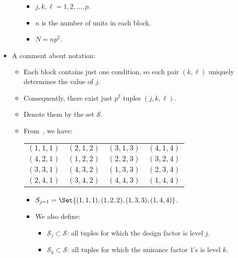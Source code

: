 \begin{itemize}
\begin{itemize}
\begin{itemize}
                        \item $ j,k,\ell=1,2,\ldots,p $.
                        \item $ n $ is the number of units in each block.
                        \item $ N=np^2 $.
                    \end{itemize}
          \end{itemize}
    \item A comment about notation:
          \begin{itemize}
              \item Each block contains just one condition, so each pair $(k, \ell)$ uniquely determines the value of $j$.
              \item Consequently, there exist just $p^2$ tuples $(j, k, \ell)$.
              \item Denote them by the set $ \mathcal{S} $.
              \item From~, we have:
                    \begin{table}[!htbp]
                        \centering
                        \begin{NiceTabular}{|cccc|}
                            \toprule
                            $ (1,1,1) $ & $ (2,1,2) $ & $ (3,1,3) $ & $ (4,1,4) $\\
                            $ (4,2,1) $ & $ (1,2,2) $ & $ (2,2,3) $ & $ (3,2,4) $\\
                            $ (3,3,1) $ & $ (4,3,2) $ & $ (1,3,3) $ & $ (2,3,4) $\\
                            $ (2,4,1) $ & $ (3,4,2) $ & $ (4,4,3) $ & $ (1,4,4) $\\
                            \bottomrule
                        \end{NiceTabular}
                    \end{table}
                    \begin{itemize}
                        \item $ S_{j=1}=\Set{(1,1,1),(1,2,2),(1,3,3),(1,4,4)} $.
                        \item We also define:
                              \begin{itemize}
                                  \item $ \mathcal{S}_j\subset \mathcal{S} $: all tuples for which the design factor is level $ j $.
                                  \item $ \mathcal{S}_k\subset \mathcal{S} $: all tuples for which the nuisance factor $ 1 $'s is level $ k $.

\end{itemize}
\end{itemize}
\end{itemize}
\end{itemize}
